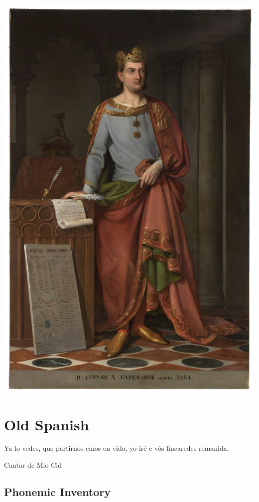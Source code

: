 \documentclass{report}[12pt]
\begin{document}
\pagebreak

\includegraphics[scale=0.45]{alfonso_x.jpg}

\thispagestyle{empty}

\pagebreak

\chapter{Old Spanish}

\epigraph{Ya lo vedes, que partirnos emos en vida, yo iré e vós fincaredes remanida.}{Cantar de Mio Cid}

\section{Phonemic Inventory}
\end{document}
